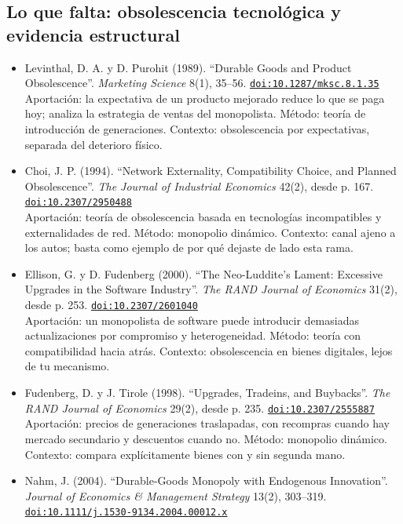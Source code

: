\documentclass[11pt]{article}
\begin{document}
\subsection*{Lo que falta: obsolescencia tecnológica y evidencia estructural}
\begin{itemize}
\item Levinthal, D. A. y D. Purohit (1989). ``Durable Goods and Product Obsolescence''. \textit{Marketing Science} 8(1), 35--56. \href{https://doi.org/10.1287/mksc.8.1.35}{\texttt{doi:10.1287/mksc.8.1.35}}\\
Aportación: la expectativa de un producto mejorado reduce lo que se paga hoy; analiza la estrategia de ventas del monopolista. Método: teoría de introducción de generaciones. Contexto: obsolescencia por expectativas, separada del deterioro físico.
\item Choi, J. P. (1994). ``Network Externality, Compatibility Choice, and Planned Obsolescence''. \textit{The Journal of Industrial Economics} 42(2), desde p. 167. \href{https://doi.org/10.2307/2950488}{\texttt{doi:10.2307/2950488}}\\
Aportación: teoría de obsolescencia basada en tecnologías incompatibles y externalidades de red. Método: monopolio dinámico. Contexto: canal ajeno a los autos; basta como ejemplo de por qué dejaste de lado esta rama.
\item Ellison, G. y D. Fudenberg (2000). ``The Neo-Luddite's Lament: Excessive Upgrades in the Software Industry''. \textit{The RAND Journal of Economics} 31(2), desde p. 253. \href{https://doi.org/10.2307/2601040}{\texttt{doi:10.2307/2601040}}\\
Aportación: un monopolista de software puede introducir demasiadas actualizaciones por compromiso y heterogeneidad. Método: teoría con compatibilidad hacia atrás. Contexto: obsolescencia en bienes digitales, lejos de tu mecanismo.
\item Fudenberg, D. y J. Tirole (1998). ``Upgrades, Tradeins, and Buybacks''. \textit{The RAND Journal of Economics} 29(2), desde p. 235. \href{https://doi.org/10.2307/2555887}{\texttt{doi:10.2307/2555887}}\\
Aportación: precios de generaciones traslapadas, con recompras cuando hay mercado secundario y descuentos cuando no. Método: monopolio dinámico. Contexto: compara explícitamente bienes con y sin segunda mano.
\item Nahm, J. (2004). ``Durable-Goods Monopoly with Endogenous Innovation''. \textit{Journal of Economics \& Management Strategy} 13(2), 303--319. \href{https://doi.org/10.1111/j.1530-9134.2004.00012.x}{\texttt{doi:10.1111/j.1530-9134.2004.00012.x}}\\

\end{itemize}
\end{document}
